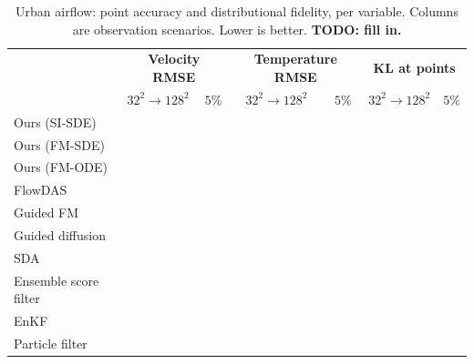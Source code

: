 \begin{table}[ht]
    \centering
    \small
    \caption{Urban airflow: point accuracy and distributional fidelity, per variable. Columns are observation scenarios. Lower is better. \textbf{TODO: fill in.}}
    \label{tab:urban_accuracy}
    \begin{tabular}{l|cc|cc|cc}
        \toprule
        & \multicolumn{2}{c|}{\textbf{Velocity RMSE}}
        & \multicolumn{2}{c|}{\textbf{Temperature RMSE}}
        & \multicolumn{2}{c}{\textbf{KL at points}} \\
        & $32^2\!\to\!128^2$ & $5\%$ & $32^2\!\to\!128^2$ & $5\%$ & $32^2\!\to\!128^2$ & $5\%$ \\
        \midrule
        Ours (SI-SDE) & & & & & & \\
        Ours (FM-SDE) & & & & & & \\
        Ours (FM-ODE) & & & & & & \\
        \midrule
        FlowDAS \cite{chen_flowdas_2025} & & & & & & \\
        Guided FM \cite{yan_fig_2024} & & & & & & \\
        Guided diffusion \cite{chung_diffusion_2023} & & & & & & \\
        SDA \cite{rozet_score-based_2023} & & & & & & \\
        Ensemble score filter \cite{bao_ensemble_2024} & & & & & & \\
        EnKF \cite{evensen_data_2022} & & & & & & \\
        Particle filter \cite{carrassi_data_2018} & & & & & & \\
        \bottomrule
    \end{tabular}
\end{table}

